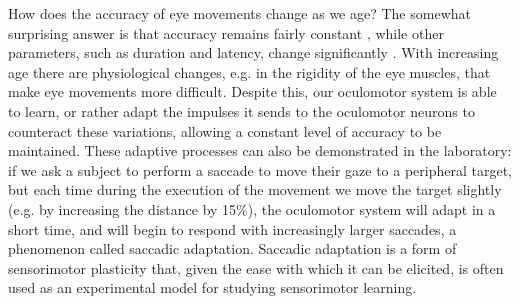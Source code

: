 \documentclass[11pt]{article}
\begin{document}
How does the accuracy of eye movements change as we age? The somewhat surprising answer is that accuracy remains fairly constant \cite{Warabi1984}, while other parameters, such as duration and latency, change significantly \cite{Munoz1998}. With increasing age there are physiological changes, e.g. in the rigidity of the eye muscles, that make eye movements more difficult. Despite this, our oculomotor system is able to learn, or rather adapt the impulses it sends to the oculomotor neurons to counteract these variations, allowing a constant level of accuracy to be maintained. These adaptive processes can also be demonstrated in the laboratory: if we ask a subject to perform a saccade to move their gaze to a peripheral target, but each time during the execution of the movement we move the target slightly (e.g. by increasing the distance by 15\%), the oculomotor system will adapt in a short time, and will begin to respond with increasingly larger saccades, a phenomenon called saccadic adaptation\cite{McLaughlin1967}. Saccadic adaptation is a form of sensorimotor plasticity that, given the ease with which it can be elicited, is often used as an experimental model for studying sensorimotor learning.
\end{document}
